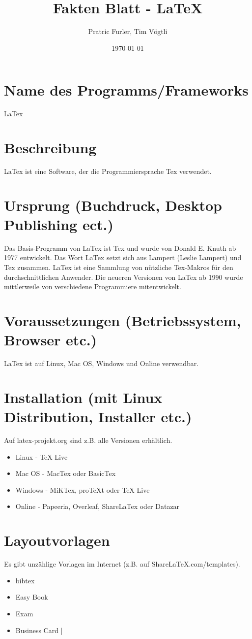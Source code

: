 \documentclass{article}
\title{Fakten Blatt - \LaTeX{}}
\author{Pratric Furler, Tim Vögtli}
\date{\today}
\begin{document}
\maketitle
\thispagestyle{fancy}

\section{Name des Programms/Frameworks}
LaTex

\section{Beschreibung}
LaTex ist eine Software, der die Programmiersprache Tex verwendet.

\section{Ursprung (Buchdruck, Desktop Publishing ect.)}

Das Basis-Programm von LaTex ist Tex und wurde von Donald E. Knuth ab 1977 entwickelt.
Das Wort LaTex setzt sich aus Lampert (Leslie Lampert) und Tex zusammen.
LaTex ist eine Sammlung von nützliche Tex-Makros für den durchschnittlichen Anwender.
Die neueren Versionen von LaTex ab 1990 wurde mittlerweile von verschiedene Programmiere mitentwickelt.

\section{Voraussetzungen (Betriebssystem, Browser etc.)}

LaTex ist auf Linux, Mac OS, Windows und Online verwendbar.

\section{Installation (mit Linux Distribution, Installer etc.)}

Auf latex-projekt.org sind z.B. alle Versionen erhältlich.
\begin{itemize}
	\item Linux - TeX Live
	\item Mac OS - MacTex oder BasicTex
	\item Windows - MiKTex, proTeXt oder TeX Live
	\item Online - Papeeria, Overleaf, ShareLaTex oder Datazar
\end{itemize}

\section{Layoutvorlagen}
Es gibt unzählige Vorlagen im Internet (z.B. auf ShareLaTeX.com/templates).
\begin{itemize}
	\item bibtex
	\item Easy Book
	\item Exam
	\item Business Card
|\end{itemize}
\end{document}
